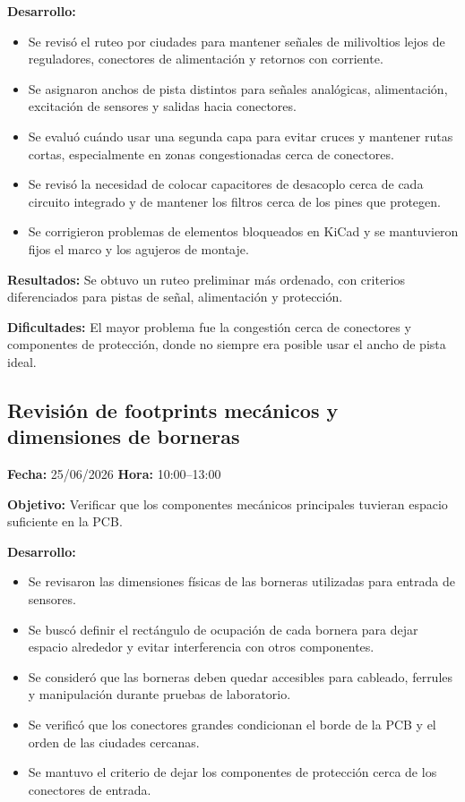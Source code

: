 \documentclass[12pt]{article}
\begin{document}
\textbf{Desarrollo:}
\begin{itemize}
\item Se revisó el ruteo por ciudades para mantener señales de milivoltios lejos de reguladores, conectores de alimentación y retornos con corriente.
\item Se asignaron anchos de pista distintos para señales analógicas, alimentación, excitación de sensores y salidas hacia conectores.
\item Se evaluó cuándo usar una segunda capa para evitar cruces y mantener rutas cortas, especialmente en zonas congestionadas cerca de conectores.
\item Se revisó la necesidad de colocar capacitores de desacoplo cerca de cada circuito integrado y de mantener los filtros cerca de los pines que protegen.
\item Se corrigieron problemas de elementos bloqueados en KiCad y se mantuvieron fijos el marco y los agujeros de montaje.
\end{itemize}

\textbf{Resultados:}
Se obtuvo un ruteo preliminar más ordenado, con criterios diferenciados para pistas de señal, alimentación y protección.

\textbf{Dificultades:}
El mayor problema fue la congestión cerca de conectores y componentes de protección, donde no siempre era posible usar el ancho de pista ideal.

\subsection{Revisión de footprints mecánicos y dimensiones de borneras}
\textbf{Fecha:} 25/06/2026 \quad \textbf{Hora:} 10:00--13:00

\textbf{Objetivo:}
Verificar que los componentes mecánicos principales tuvieran espacio suficiente en la PCB.

\textbf{Desarrollo:}
\begin{itemize}
\item Se revisaron las dimensiones físicas de las borneras utilizadas para entrada de sensores.
\item Se buscó definir el rectángulo de ocupación de cada bornera para dejar espacio alrededor y evitar interferencia con otros componentes.
\item Se consideró que las borneras deben quedar accesibles para cableado, ferrules y manipulación durante pruebas de laboratorio.
\item Se verificó que los conectores grandes condicionan el borde de la PCB y el orden de las ciudades cercanas.
\item Se mantuvo el criterio de dejar los componentes de protección cerca de los conectores de entrada.
\end{itemize}
\end{document}
